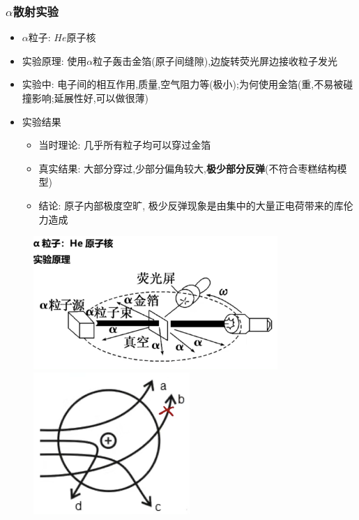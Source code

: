 \documentclass{article}
\begin{document}
\vspace{2em}

\subsubsection{\texorpdfstring{$\alpha$}*散射实验}
\begin{itemize}
    \item $\alpha$粒子: $He$原子核
    \item 实验原理: 使用$\alpha$粒子轰击金箔(原子间缝隙),边旋转荧光屏边接收粒子发光
    \item 实验中: 电子间的相互作用,质量,空气阻力等(极小);为何使用金箔(重,不易被碰撞影响;延展性好,可以做很薄)
    \item 实验结果
          \begin{itemize}
              \item[] 当时理论: 几乎所有粒子均可以穿过金箔
              \item[] 真实结果: 大部分穿过,少部分偏角较大,\textbf{极少部分反弹}(不符合枣糕结构模型)
              \item[] 结论: 原子内部极度空旷, 极少反弹现象是由集中的大量正电荷带来的库伦力造成
          \end{itemize}
\end{itemize}

\begin{center}
    \begin{figure}[h]
        \centering
        \begin{minipage}{0.58\textwidth}
            \centering
            \includegraphics[width=25em]{./pictures/14.png}
        \end{minipage}
        \hfill
        \begin{minipage}{0.4\textwidth}
            \centering
            \includegraphics[width=16em]{./pictures/15.png}
        \end{minipage}
    \end{figure}
\end{center}
\end{document}
